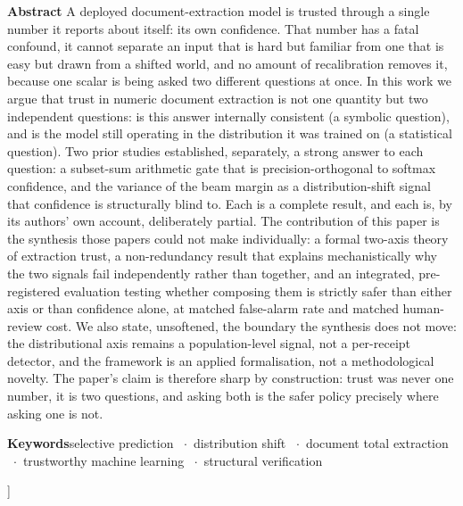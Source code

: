 \documentclass[10pt,twocolumn,a4paper]{article}
\newcommand{\kwsep}{\ $\cdot$\ }
\begin{document}
{\begin{minipage}{\textwidth}\small
\noindent\textbf{Abstract}\quad
A deployed document-extraction model is trusted through a single number it
reports about itself: its own confidence. That number has a fatal confound,
it cannot separate an input that is hard but familiar from one that is easy
but drawn from a shifted world, and no amount of recalibration removes it,
because one scalar is being asked two different questions at once. In this
work we argue that trust in numeric document extraction is not one quantity
but two independent questions: is this answer internally consistent (a
symbolic question), and is the model still operating in the distribution it
was trained on (a statistical question). Two prior studies established,
separately, a strong answer to each question: a subset-sum arithmetic gate
that is precision-orthogonal to softmax confidence, and the variance of the
beam margin as a distribution-shift signal that confidence is structurally
blind to. Each is a complete result, and each is, by its authors' own
account, deliberately partial. The contribution of this paper is the
synthesis those papers could not make individually: a formal two-axis theory
of extraction trust, a non-redundancy result that explains mechanistically
why the two signals fail independently rather than together, and an
integrated, pre-registered evaluation testing whether composing them is
strictly safer than either axis or than confidence alone, at matched
false-alarm rate and matched human-review cost. We also state, unsoftened,
the boundary the synthesis does not move: the distributional axis remains a
population-level signal, not a per-receipt detector, and the framework is an
applied formalisation, not a methodological novelty. The paper's claim is
therefore sharp by construction: trust was never one number, it is two
questions, and asking both is the safer policy precisely where asking one is
not.
\par\vspace{9pt}
\noindent\textbf{Keywords}\quad selective prediction \kwsep distribution
shift \kwsep document total extraction \kwsep trustworthy machine learning
\kwsep structural verification
\end{minipage}
\vspace{1.5em}
}]
\end{document}
